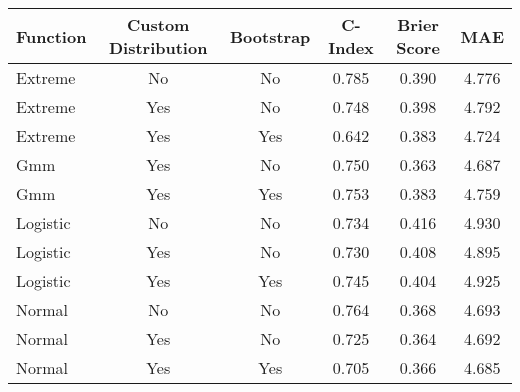 \begin{tabular}{lccccc}
\toprule
Function & Custom Distribution & Bootstrap & C-Index & Brier Score & MAE \\
\midrule
Extreme & No & No & 0.785 & 0.390 & 4.776 \\
Extreme & Yes & No & 0.748 & 0.398 & 4.792 \\
Extreme & Yes & Yes & 0.642 & 0.383 & 4.724 \\
Gmm & Yes & No & 0.750 & 0.363 & 4.687 \\
Gmm & Yes & Yes & 0.753 & 0.383 & 4.759 \\
Logistic & No & No & 0.734 & 0.416 & 4.930 \\
Logistic & Yes & No & 0.730 & 0.408 & 4.895 \\
Logistic & Yes & Yes & 0.745 & 0.404 & 4.925 \\
Normal & No & No & 0.764 & 0.368 & 4.693 \\
Normal & Yes & No & 0.725 & 0.364 & 4.692 \\
Normal & Yes & Yes & 0.705 & 0.366 & 4.685 \\
\bottomrule
\end{tabular}
